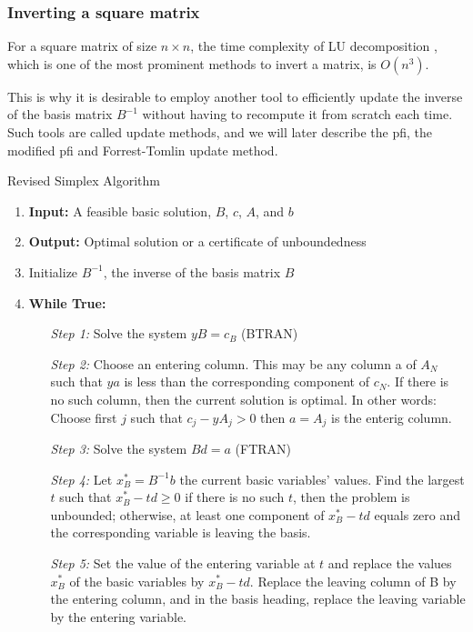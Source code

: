 \subsubsection{Inverting a square matrix}
For a square matrix of size \(n \times n\), the time complexity of LU decomposition
\parencite{golub2013matrix},
which is one of the
most prominent methods to invert a matrix, is $O(n^3) $.

This is why it is desirable to employ another tool to efficiently
update the inverse of the basis matrix $B^{-1}$
without having to recompute it from scratch each time.
Such tools are called update methods,
and we will later describe the \gls{pfi}, the modified \gls{pfi} and Forrest-Tomlin update method.

\begin{algorithm}
    \caption{Revised Simplex Algorithm}
    \begin{enumerate}
        \item \textbf{Input:} A feasible basic solution, \( B \), \( c \), \( A \), and \( b \)
        \item \textbf{Output:} Optimal solution or a certificate of unboundedness
        \item Initialize \( B^{-1} \), the inverse of the basis matrix \( B \)
        \item \textbf{While True:}
              \begin{itemize}
                  \setlength{\itemindent}{3em}
                  \item[\textit{Step 1:}] Solve the system \( yB = c_B \) (BTRAN)
                  \item[\textit{Step 2:}] Choose an entering column. This may be any column a of
                      $A_N$ such that $ya$ is less than the corresponding component
                      of $c_N$. If there is no such column, then the current solution is optimal.
                      In other words: Choose first \( j \) such that \( c_j -yA_j > 0 \)
                      then $a=A_j$ is the enterig column.
                  \item[\textit{Step 3:}] Solve the system $Bd = a$ (FTRAN)
                  \item[\textit{Step 4:}] Let $x_B^{\ast} = B^{-1}b$ the current basic variables' values.
                      Find the largest $t$ such that \( x_B^{\ast} - td \geq 0\)
                      if there is no such $t$, then the problem is unbounded; otherwise, at least
                      one component of  \( x_B^{\ast} - td \) equals zero and the corresponding variable is leaving the basis.
                  \item[\textit{Step 5:}] Set the value of the entering variable at
                      $t$ and replace the values $x_B^{\ast}$ of the basic variables by \( x_B^{\ast} - td \).
                      Replace the leaving column of B by the entering column, and in the basis heading,
                      replace the leaving variable by the entering variable.
              \end{itemize}


\end{enumerate}
\end{algorithm}
